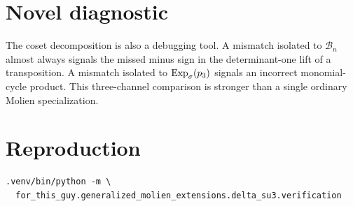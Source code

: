 \documentclass[11pt]{article}
\begin{document}
\section{Novel diagnostic}
The coset decomposition is also a debugging tool.  A mismatch isolated to $\mathcal B_n$ almost always signals the missed minus sign in the determinant-one lift of a transposition.  A mismatch isolated to $\operatorname{Exp}_{\sigma}(p_3)$ signals an incorrect monomial-cycle product.  This three-channel comparison is stronger than a single ordinary Molien specialization.

\section*{Reproduction}
\begin{verbatim}
.venv/bin/python -m \
  for_this_guy.generalized_molien_extensions.delta_su3.verification
\end{verbatim}
\end{document}
